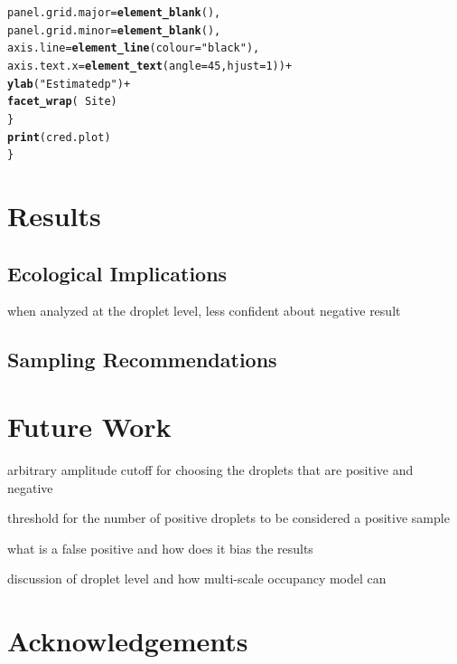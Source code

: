 \documentclass[12pt]{article}\usepackage[]{graphicx}\usepackage[]{color}
\makeatletter
\newcommand{\hlnum}[1]{\textcolor[rgb]{0.686,0.059,0.569}{#1}}%
\newcommand{\hlstr}[1]{\textcolor[rgb]{0.192,0.494,0.8}{#1}}%
\newcommand{\hlopt}[1]{\textcolor[rgb]{0,0,0}{#1}}%
\newcommand{\hlstd}[1]{\textcolor[rgb]{0.345,0.345,0.345}{#1}}%
\newcommand{\hlkwc}[1]{\textcolor[rgb]{0.333,0.667,0.333}{#1}}%
\newcommand{\hlkwd}[1]{\textcolor[rgb]{0.737,0.353,0.396}{\textbf{#1}}}%
\newenvironment{kframe}{%
 \def\at@end@of@kframe{}%
 \ifinner\ifhmode%
  \def\at@end@of@kframe{\end{minipage}}%
  \begin{minipage}{\columnwidth}%
 \fi\fi%
 \def\FrameCommand##1{\hskip\@totalleftmargin \hskip-\fboxsep
 \colorbox{shadecolor}{##1}\hskip-\fboxsep
     \hskip-\linewidth \hskip-\@totalleftmargin \hskip\columnwidth}%
 \MakeFramed {\advance\hsize-\width
   \@totalleftmargin\z@ \linewidth\hsize
   \@setminipage}}%
 {\par\unskip\endMakeFramed%
 \at@end@of@kframe}
\newenvironment{knitrout}{}{} %
\newcommand{\hlnum}[1]{\textcolor[rgb]{0.686,0.059,0.569}{#1}}%
\newcommand{\hlstr}[1]{\textcolor[rgb]{0.192,0.494,0.8}{#1}}%
\newcommand{\hlopt}[1]{\textcolor[rgb]{0,0,0}{#1}}%
\newcommand{\hlstd}[1]{\textcolor[rgb]{0.345,0.345,0.345}{#1}}%
\newcommand{\hlkwc}[1]{\textcolor[rgb]{0.333,0.667,0.333}{#1}}%
\newcommand{\hlkwd}[1]{\textcolor[rgb]{0.737,0.353,0.396}{\textbf{#1}}}%
\newenvironment{kframe}{%
 \def\at@end@of@kframe{}%
 \ifinner\ifhmode%
  \def\at@end@of@kframe{\end{minipage}}%
  \begin{minipage}{\columnwidth}%
 \fi\fi%
 \def\FrameCommand##1{\hskip\@totalleftmargin \hskip-\fboxsep
 \colorbox{shadecolor}{##1}\hskip-\fboxsep
     \hskip-\linewidth \hskip-\@totalleftmargin \hskip\columnwidth}%
 \MakeFramed {\advance\hsize-\width
   \@totalleftmargin\z@ \linewidth\hsize
   \@setminipage}}%
 {\par\unskip\endMakeFramed%
 \at@end@of@kframe}
\newenvironment{knitrout}{}{} %
\makeatother
\begin{document}
\begin{knitrout}
\begin{kframe}
\begin{alltt}
            \hlkwc{panel.grid.major} \hlstd{=} \hlkwd{element_blank}\hlstd{(),}
            \hlkwc{panel.grid.minor} \hlstd{=} \hlkwd{element_blank}\hlstd{(),}
            \hlkwc{axis.line} \hlstd{=} \hlkwd{element_line}\hlstd{(}\hlkwc{colour} \hlstd{=} \hlstr{"black"}\hlstd{),}
            \hlkwc{axis.text.x} \hlstd{=} \hlkwd{element_text}\hlstd{(}\hlkwc{angle} \hlstd{=} \hlnum{45}\hlstd{,} \hlkwc{hjust} \hlstd{=} \hlnum{1}\hlstd{))} \hlopt{+}
      \hlkwd{ylab}\hlstd{(}\hlstr{"Estimated p"}\hlstd{)} \hlopt{+}
      \hlkwd{facet_wrap}\hlstd{(}\hlopt{~}\hlstd{Site)}
  \hlstd{\}}
  \hlkwd{print}\hlstd{(cred.plot)}
\hlstd{\}}
\end{alltt}
\end{kframe}
\end{knitrout}












\section{Results}

\subsection{Ecological Implications}

when analyzed at the droplet level, less confident about negative result

\subsection{Sampling Recommendations}

\section{Future Work}

arbitrary amplitude cutoff for choosing the droplets that are positive and negative

threshold for the number of positive droplets to be considered a positive sample 

what is a false positive and how does it bias the results 

discussion of droplet level and how multi-scale occupancy model can 

\section{Acknowledgements}
\end{document}
